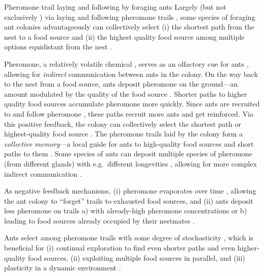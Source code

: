 \documentclass[fleqn,10pt,lineno]{wlpeerj}
\begin{document}
\begin{mybox}[label=box:ants, breakable]{Pheromone trail laying and following by foraging ants}
Largely (but not exclusively \cite{evison2008combined,czaczkes2015trail,robinson2005no}) via laying and following pheromone trails \cite{czaczkes2015trail}, 
some species of foraging ant colonies advantageously \cite{deneubourg1983probabilistic} can collectively select 
(i) the shortest path from the nest to a food source \cite{goss1989self}
and
(ii) the highest quality food source among multiple options equidistant from the nest \cite{beckers1993modulation}. 

Pheromone, a relatively volatile chemical \cite{david2009trail}, serves as an olfactory cue for ants \cite{knaden2016sensory}, allowing for \emph{indirect} communication between ants in the colony. 
On the way back to the nest from a food source, ants deposit pheromone on the ground---an amount modulated by the quality of the food source \cite{beckers1993modulation}.
Shorter paths to higher quality food sources accumulate pheromone more quickly.
Since ants are recruited to and follow pheromone \cite{beckers1993modulation,czaczkes2015trail}, these paths recruit more ants and get reinforced. Via this positive feedback, the colony can collectively select the shortest path or highest-quality food source \cite{jackson2006communication,czaczkes2015trail,bonabeau1999swarm}.
The pheromone trails laid by the colony form a \emph{collective memory}---a local guide for ants to high-quality food sources and short paths to them \cite{jackson2006communication}.
Some species of ants can deposit multiple species of pheromone (from different glands) with e.g.\ different longevities \cite{czaczkes2015trail}, allowing for more complex indirect communication \cite{jackson2006communication,robinson2005no}.

As negative feedback mechanisms, 
(i) pheromone evaporates over time \cite{jackson2006communication,david2009trail,van2011temperature}, allowing the ant colony to ``forget'' trails to exhausted food sources,
and 
(ii) ants deposit less pheromone on trails a) with already-high pheromone concentrations \cite{czaczkes2013ant} or b) leading to food sources already occupied by their nestmates \cite{wendt2020negative}.

Ants select among pheromone trails with some degree of stochasticity \cite{deneubourg1990self}, which is beneficial for 
(i) continual exploration to find even shorter paths and even higher-quality food sources, 
(ii) exploiting multiple food sources in parallel, 
and 
(iii) plasticity in a dynamic environment \cite{deneubourg1983probabilistic,shiraishi2019diverse,deneubourg1986random,dussutour2009noise,edelstein1995trail}.




\end{mybox}
\end{document}
